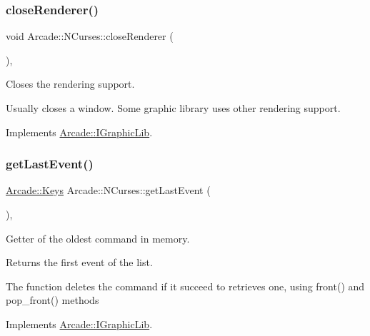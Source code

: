 \subsubsection{\texorpdfstring{close\+Renderer()}{closeRenderer()}}
{\footnotesize\ttfamily void Arcade\+::\+N\+Curses\+::close\+Renderer (\begin{DoxyParamCaption}{ }\end{DoxyParamCaption})\hspace{0.3cm}{\ttfamily [final]}, {\ttfamily [virtual]}}



Closes the rendering support. 

Usually closes a window. Some graphic library uses other rendering support. 

Implements \hyperlink{class_arcade_1_1_i_graphic_lib_aa7c3c8b922fbc94f5e74ecfebad52742}{Arcade\+::\+I\+Graphic\+Lib}.

\mbox{\label{class_arcade_1_1_n_curses_a0c00b4aede0c9345f525fcb812fe8f78}} 
\subsubsection{\texorpdfstring{get\+Last\+Event()}{getLastEvent()}}
{\footnotesize\ttfamily \hyperlink{namespace_arcade_a9b501908b20bc993e4f8226db5323c41}{Arcade\+::\+Keys} Arcade\+::\+N\+Curses\+::get\+Last\+Event (\begin{DoxyParamCaption}{ }\end{DoxyParamCaption})\hspace{0.3cm}{\ttfamily [final]}, {\ttfamily [virtual]}}



Getter of the oldest command in memory. 

\begin{DoxyReturn}{Returns}
the first event of the list.
\end{DoxyReturn}
The function deletes the command if it succeed to retrieves one, using front() and pop\+\_\+front() methods 

Implements \hyperlink{class_arcade_1_1_i_graphic_lib_a801ebd3cff2c861e4b2a1e664c123da7}{Arcade\+::\+I\+Graphic\+Lib}.

\mbox{\label{class_arcade_1_1_n_curses_a9f561bd405af76689763819794382ef1}} 
